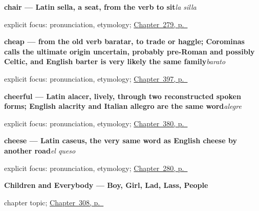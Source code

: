 \noindent\begin{minipage}[t]{\linewidth}
\raggedright
\textbf{chair — Latin sella, a seat, from the verb to sit}\enspace\emph{la silla}\par
\footnotesize explicit focus: pronunciation, etymology; \hyperref[ch:la-habitacion]{Chapter~279, p.~\pageref*{ch:la-habitacion}}
\end{minipage}\par\smallskip

\noindent\begin{minipage}[t]{\linewidth}
\raggedright
\textbf{cheap — from the old verb baratar, to trade or haggle; Corominas calls the ultimate origin uncertain, probably pre-Roman and possibly Celtic, and English barter is very likely the same family}\enspace\emph{barato}\par
\footnotesize explicit focus: pronunciation, etymology; \hyperref[ch:barato-y-caro]{Chapter~397, p.~\pageref*{ch:barato-y-caro}}
\end{minipage}\par\smallskip

\noindent\begin{minipage}[t]{\linewidth}
\raggedright
\textbf{cheerful — Latin alacer, lively, through two reconstructed spoken forms; English alacrity and Italian allegro are the same word}\enspace\emph{alegre}\par
\footnotesize explicit focus: pronunciation, etymology; \hyperref[ch:simpatico-y-alegre]{Chapter~380, p.~\pageref*{ch:simpatico-y-alegre}}
\end{minipage}\par\smallskip

\noindent\begin{minipage}[t]{\linewidth}
\raggedright
\textbf{cheese — Latin caseus, the very same word as English cheese by another road}\enspace\emph{el queso}\par
\footnotesize explicit focus: pronunciation, etymology; \hyperref[ch:la-compra]{Chapter~280, p.~\pageref*{ch:la-compra}}
\end{minipage}\par\smallskip

\noindent\begin{minipage}[t]{\linewidth}
\raggedright
\textbf{Children and Everybody --- Boy, Girl, Lad, Lass, People}\par
\footnotesize chapter topic; \hyperref[ch:ninos-y-gente]{Chapter~308, p.~\pageref*{ch:ninos-y-gente}}
\end{minipage}\par\smallskip

